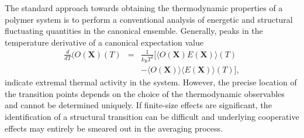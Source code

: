 \documentclass[12pt]{report}
\begin{document}
The standard approach towards obtaining the thermodynamic properties of a
polymer system is to perform a conventional analysis of energetic and
structural 
fluctuating quantities in the canonical ensemble. Generally, peaks in the 
temperature derivative of a canonical expectation value 
\begin{eqnarray}
\frac{d}{dT}(O(\mathbf{X})(T)& = &\frac{1}{k_\mathrm{B}T^{2}}[\langle
O(\mathbf{X})
E(\mathbf{X})\rangle (T)\nonumber\\
&& - \langle O(\mathbf{X}) \rangle \langle E(\mathbf{X})\rangle (T)],
\end{eqnarray}
%
indicate extremal thermal activity in the system. However, the precise
location
of the transition points depends on the choice of the thermodynamic 
observables
and cannot be determined uniquely. If finite-size effects are significant,
the identification of a structural transition can be difficult and
underlying cooperative effects may entirely be smeared out in the
averaging process.
\end{document}

